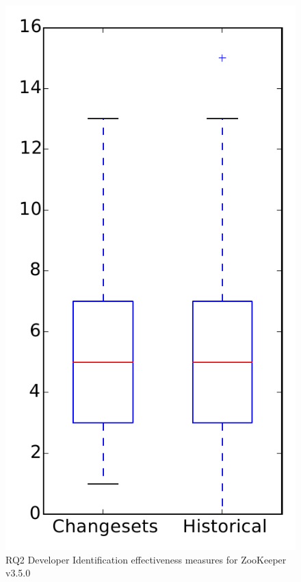 
\begin{figure}
\centering
\includegraphics[height=0.4\textheight]{figures/dit/rq2_zookeeper}
\caption{RQ2 Developer Identification effectiveness measures for ZooKeeper v3.5.0}
\label{fig:dit:rq2:zookeeper}
\end{figure}
